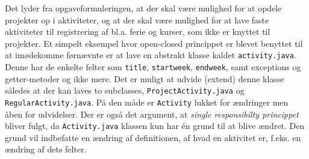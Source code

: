 Det lyder fra opgaveformuleringen, at der skal være mulighed for at opdele projekter op i aktiviteter, og at der skal være mulighed for at lave faste aktiviteter til registrering af bl.a. ferie og kurser, som ikke er knyttet til projekter. Et simpelt eksempel hvor open-closed princippet er blevet benyttet til at imødekomme førnævnte er at lave en abstrakt klasse kaldet \texttt{activity.java}. Denne har de enkelte felter som \texttt{title}, \texttt{startweek}, \texttt{endweek}, samt exceptions og getter-metoder og ikke mere. Det er muligt at udvide (extend) denne klasse således at der kan laves to subclasses, \texttt{ProjectActivity.java} og \texttt{RegularActivity.java}. På den måde er \texttt{Activity} lukket for ændringer men åben for udvidelser. Der er også det argument, at \textit{single responsibilty princippet} bliver fulgt, da \texttt{Activity.java} klassen kun har én grund til at blive ændret. Den grund vil indbefatte en ændring af definitionen, af hvad en aktivitet er, f.eks. en ændring af dets felter.





